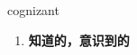 
\begin{frame}
{\huge cognizant}
\begin{center}
\begin{enumerate}\Large
  \item \textbf{知道的，意识到的}
\end{enumerate}
\end{center}
\end{frame}
